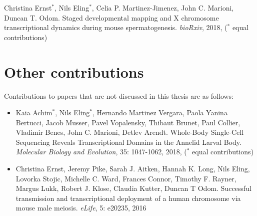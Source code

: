 Christina Ernst$^\ast$, Nils Eling$^\ast$, Celia P. Martinez-Jimenez, John C. Marioni, Duncan T. Odom. Staged developmental mapping and X chromosome transcriptional dynamics during mouse spermatogenesis. \emph{bioRxiv}, 2018, ($^\ast$ equal contributions)


\section{Other contributions}

Contributions to papers that are not discussed in this thesis are as follows:

\begin{itemize}
\item Kaia Achim$^\ast$, Nils Eling$^\ast$, Hernando Martinez Vergara, Paola Yanina Bertucci, Jacob Musser, Pavel Vopalensky, Thibaut Brunet, Paul Collier, Vladimir Benes, John C. Marioni, Detlev Arendt. Whole-Body Single-Cell Sequencing Reveals Transcriptional Domains in the Annelid Larval Body. \emph{Molecular Biology and Evolution}, 35: 1047-1062, 2018, ($^\ast$ equal contributions)\\
\item Christina Ernst, Jeremy Pike, Sarah J. Aitken, Hannah K. Long, Nils Eling, Lovorka Stojic, Michelle C. Ward, Frances Connor, Timothy F. Rayner, Margus Lukk, Robert J. Klose, Claudia Kutter, Duncan T Odom. Successful transmission and transcriptional deployment of a human chromosome via mouse male meiosis. \emph{eLife}, 5: e20235, 2016 
\end{itemize}